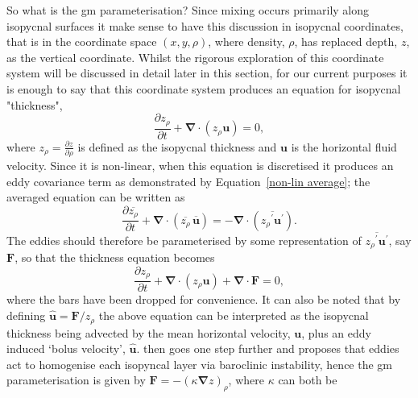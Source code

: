 \documentclass[10pt,a4paper]{report}
\newcommand*\mean[1]{\overline{#1}}
\newcommand*\res[1]{{#1}^{\prime}}
\newcommand*\equref[1]{Equation~\eqref{#1}}
\begin{document}
 So what is the \gls{gm} parameterisation? Since mixing occurs primarily
 along isopycnal surfaces it make sense to have this discussion in
 isopycnal coordinates, that is in the coordinate space $(x,y,\rho)$,
  where density, $\rho$, has replaced depth, $z$, as the vertical
  coordinate. Whilst the rigorous exploration of this coordinate system
  will be discussed in detail later in this section, for our current purposes 
  it is enough to say that this coordinate system produces an equation
  for isopycnal "thickness",
  \begin{equation}
  \label{cont}
  \frac{\partial z_{\rho}}{\partial t} + \boldsymbol{\nabla}\cdot\left(z_{\rho}\boldsymbol{u}\right) = 0,
  \end{equation}
  where $z_{\rho} = \frac{\partial z}{\partial \rho}$ is defined as the
   isopycnal thickness and $\boldsymbol{u}$ is the horizontal fluid
   velocity. Since it is non-linear, when this equation is discretised
   it produces an eddy covariance term as demonstrated by 
   \equref{non-lin average}; the averaged equation can be written as
     \begin{equation}
     \frac{\partial \mean{z_{\rho}}}{\partial t} + \boldsymbol{\nabla}\cdot\left(\mean{z_{\rho}} \, \mean{\boldsymbol{u}}\right) = - \boldsymbol{\nabla}\cdot\left(\mean{\res{z_{\rho}} \res{\boldsymbol{u}}}\right).
     \label{meancont}
     \end{equation}
   The eddies should therefore be parameterised by some representation
   of $\mean{\res{z_{\rho}} \res{\boldsymbol{u}}}$, say $\boldsymbol{F}$,
   so that the thickness equation becomes
     \begin{equation}
     \frac{\partial z_{\rho}}{\partial t} + \boldsymbol{\nabla}\cdot\left(z_{\rho}\boldsymbol{u}\right) + \boldsymbol{\nabla}\cdot\boldsymbol{F} = 0,
     \label{thicknessgeneralparam}
     \end{equation}
    where the bars have been dropped for convenience. It can also 
    be noted that by defining $\hat{\boldsymbol{u}} = \boldsymbol{F}/z_{\rho}$ the above equation can be interpreted as
    the isopycnal thickness
    being advected by the mean horizontal velocity, $\boldsymbol{u}$, 
    plus an eddy induced
    `bolus velocity', $\hat{\boldsymbol{u}}$. \cite{gent1990} then goes one
    step further and proposes that eddies act to homogenise each
    isopyncal layer via baroclinic instability, hence the 
    \gls{gm} parameterisation is given by $\boldsymbol{F} = - \left(\kappa
    \boldsymbol{\nabla} z \right)_{\rho}$, where $\kappa$ can both be
\end{document}
